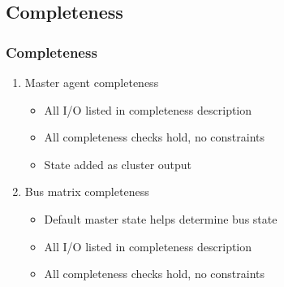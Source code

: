 \documentclass[]{beamer}
\begin{document}
\begin{frame}
\begin{columns}

          \end{columns}
         \end{frame}

       \subsection{Completeness}
       \begin{frame}
        \frametitle{Completeness}
          \begin{enumerate}
             \item<1-> Master agent completeness
              \begin{itemize}
                \item<1-> All I/O listed in completeness description
                \item<1-> All completeness checks hold, no constraints
                \item<1-> State added as cluster output
              \end{itemize}
             \item<2-> Bus matrix completeness
              \begin{itemize}
                \item<2-> Default master state helps determine bus state
                \item<2-> All I/O listed in completeness description
                \item<2-> All completeness checks hold, no constraints
              \end{itemize}
          \end{enumerate}
       \end{frame}
\end{document}
